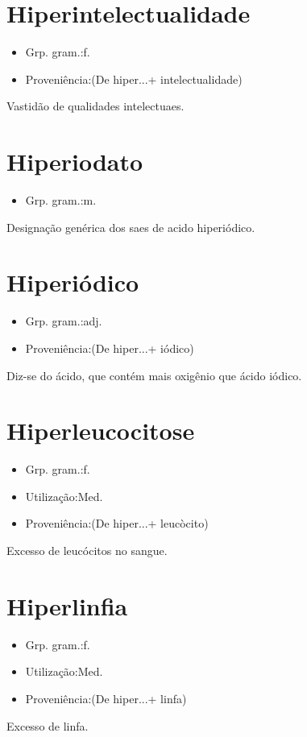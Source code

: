 \documentclass{article}
\begin{document}
\section{Hiperintelectualidade}
\begin{itemize}
\item {Grp. gram.:f.}
\end{itemize}
\begin{itemize}
\item {Proveniência:(De \textunderscore hiper...\textunderscore  + \textunderscore intelectualidade\textunderscore )}
\end{itemize}
Vastidão de qualidades intelectuaes.
\section{Hiperiodato}
\begin{itemize}
\item {Grp. gram.:m.}
\end{itemize}
Designação genérica dos saes de acido hiperiódico.
\section{Hiperiódico}
\begin{itemize}
\item {Grp. gram.:adj.}
\end{itemize}
\begin{itemize}
\item {Proveniência:(De \textunderscore hiper...\textunderscore  + \textunderscore iódico\textunderscore )}
\end{itemize}
Diz-se do ácido, que contém mais oxigênio que ácido iódico.
\section{Hiperleucocitose}
\begin{itemize}
\item {Grp. gram.:f.}
\end{itemize}
\begin{itemize}
\item {Utilização:Med.}
\end{itemize}
\begin{itemize}
\item {Proveniência:(De \textunderscore hiper...\textunderscore  + \textunderscore leucòcito\textunderscore )}
\end{itemize}
Excesso de leucócitos no sangue.
\section{Hiperlinfia}
\begin{itemize}
\item {Grp. gram.:f.}
\end{itemize}
\begin{itemize}
\item {Utilização:Med.}
\end{itemize}
\begin{itemize}
\item {Proveniência:(De \textunderscore hiper...\textunderscore  + \textunderscore linfa\textunderscore )}
\end{itemize}
Excesso de linfa.
\end{document}

